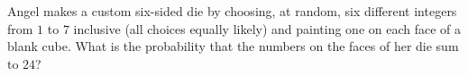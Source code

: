 Angel makes a custom six-sided die by choosing, at random, six different integers from $1$ to $7$ inclusive (all choices equally likely) and painting one on each face of a blank cube. What is the probability that the numbers on the faces of her die sum to $24$?
